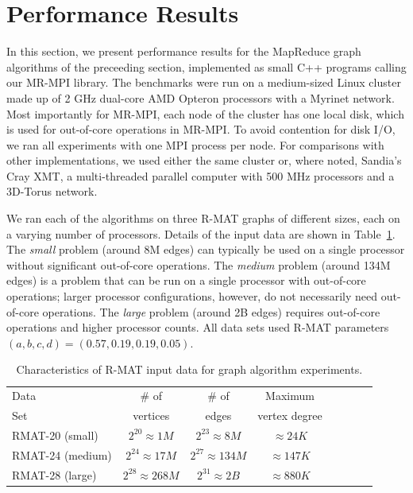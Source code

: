 \section{Performance Results}
\label{sec:results}

In this section, we present performance results for the MapReduce
graph algorithms of the preceeding section, implemented as small C++
programs calling our MR-MPI library.
The benchmarks were run on a medium-sized Linux cluster made up of 2 GHz
dual-core AMD Opteron processors with a Myrinet network.  Most importantly
for MR-MPI, each node of the cluster has one local disk, which is used
for out-of-core operations in MR-MPI.  To avoid contention for disk I/O, we 
ran all experiments with one MPI process per node.  For comparisons with
other implementations, we used either the same cluster or, where noted,
Sandia's Cray XMT, a multi-threaded parallel computer with 500 {MHz} processors
and a 3D-Torus network.

We ran each of the algorithms on three R-MAT graphs of
different sizes, each on a varying number of processors.  Details of the
input data are shown in Table~\ref{t:rmats}.
The {\it small} problem (around 8M edges) can typically be used
on a single processor without significant out-of-core operations.
The {\it medium} problem (around 134M edges) is a 
problem that can be run
on a single processor with out-of-core operations; larger processor 
configurations, however, do not necessarily need out-of-core operations.
The {\it large} problem (around 2B
edges) requires out-of-core operations and higher processor counts.
All data sets used R-MAT parameters $(a, b, c, d) = (0.57, 0.19, 0.19, 0.05)$.

\begin{table}
\begin{center}
\begin{tabular}{|l|c|c|c|c|c|c|c|}
\hline
Data & \# of    & \# of & Maximum \\
Set  & vertices & edges & vertex degree\\
\hline
RMAT-20 (small)   &$2^{20} \approx 1M$ & $2^{23} \approx 8M$ &  $\approx 24K$ \\
RMAT-24 (medium)  &$2^{24} \approx 17M$ & $2^{27} \approx 134M$ &  $\approx 147K$ \\
RMAT-28 (large)   &$2^{28} \approx 268M$ & $2^{31} \approx 2B$& $\approx 880K$ \\
\hline
\end{tabular}
\caption{Characteristics of R-MAT input data for graph algorithm
experiments.}
\label{t:rmats}
\end{center}
\end{table}

